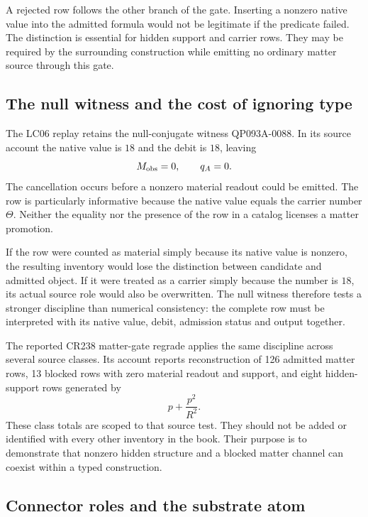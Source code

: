 A rejected row follows the other branch of the gate. Inserting a nonzero native value into the admitted formula would not be legitimate if the predicate failed. The distinction is essential for hidden support and carrier rows. They may be required by the surrounding construction while emitting no ordinary matter source through this gate.

\subsection{The null witness and the cost of ignoring type}

The LC06 replay retains the null-conjugate witness QP093A-0088. In its source account the native value is $18$ and the debit is $18$, leaving
\begin{equation}
M_{\rm obs}=0,\qquad q_A=0.
\end{equation}
The cancellation occurs before a nonzero material readout could be emitted. The row is particularly informative because the native value equals the carrier number $\Theta$. Neither the equality nor the presence of the row in a catalog licenses a matter promotion.

If the row were counted as material simply because its native value is nonzero, the resulting inventory would lose the distinction between candidate and admitted object. If it were treated as a carrier simply because the number is $18$, its actual source role would also be overwritten. The null witness therefore tests a stronger discipline than numerical consistency: the complete row must be interpreted with its native value, debit, admission status and output together.

The reported CR238 matter-gate regrade applies the same discipline across several source classes. Its account reports reconstruction of 126 admitted matter rows, 13 blocked rows with zero material readout and support, and eight hidden-support rows generated by
\begin{equation}
p+\frac{p^2}{R^2}.
\end{equation}
These class totals are scoped to that source test. They should not be added or identified with every other inventory in the book. Their purpose is to demonstrate that nonzero hidden structure and a blocked matter channel can coexist within a typed construction.\cite{viireview}

\subsection{Connector roles and the substrate atom}

